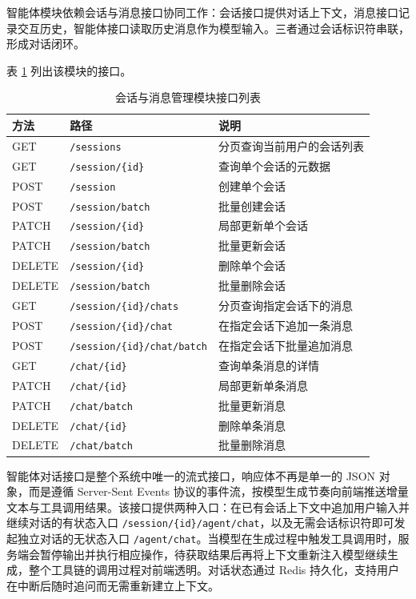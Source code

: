 \par 智能体模块依赖会话与消息接口协同工作：会话接口提供对话上下文，消息接口记录交互历史，智能体接口读取历史消息作为模型输入。三者通过会话标识符串联，形成对话闭环。

\par 表 \ref{tab:api-session} 列出该模块的接口。

\begin{table}[htbp]
  \centering
  \caption{会话与消息管理模块接口列表}
  \label{tab:api-session}
  \begin{tabular}{p{2cm}p{5cm}p{6cm}}
    \hline
    方法 & 路径 & 说明 \\
    \hline
    GET & \texttt{/sessions} & 分页查询当前用户的会话列表 \\
    GET & \texttt{/session/\{id\}} & 查询单个会话的元数据 \\
    POST & \texttt{/session} & 创建单个会话 \\
    POST & \texttt{/session/batch} & 批量创建会话 \\
    PATCH & \texttt{/session/\{id\}} & 局部更新单个会话 \\
    PATCH & \texttt{/session/batch} & 批量更新会话 \\
    DELETE & \texttt{/session/\{id\}} & 删除单个会话 \\
    DELETE & \texttt{/session/batch} & 批量删除会话 \\
    GET & \texttt{/session/\{id\}/chats} & 分页查询指定会话下的消息 \\
    POST & \texttt{/session/\{id\}/chat} & 在指定会话下追加一条消息 \\
    POST & \texttt{/session/\{id\}/chat/batch} & 在指定会话下批量追加消息 \\
    GET & \texttt{/chat/\{id\}} & 查询单条消息的详情 \\
    PATCH & \texttt{/chat/\{id\}} & 局部更新单条消息 \\
    PATCH & \texttt{/chat/batch} & 批量更新消息 \\
    DELETE & \texttt{/chat/\{id\}} & 删除单条消息 \\
    DELETE & \texttt{/chat/batch} & 批量删除消息 \\
    \hline
  \end{tabular}
\end{table}

\par 智能体对话接口是整个系统中唯一的流式接口，响应体不再是单一的 JSON 对象，而是遵循 Server-Sent Events 协议的事件流，按模型生成节奏向前端推送增量文本与工具调用结果。该接口提供两种入口：在已有会话上下文中追加用户输入并继续对话的有状态入口 \texttt{/session/\{id\}/agent/chat}，以及无需会话标识符即可发起独立对话的无状态入口 \texttt{/agent/chat}。当模型在生成过程中触发工具调用时，服务端会暂停输出并执行相应操作，待获取结果后再将上下文重新注入模型继续生成，整个工具链的调用过程对前端透明。对话状态通过 Redis 持久化，支持用户在中断后随时追问而无需重新建立上下文。

